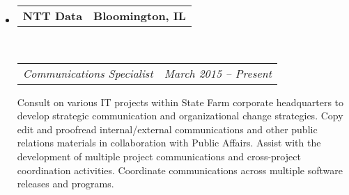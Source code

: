 \documentclass[10pt,letterpaper]{article}
\makeatletter
\newcommand{\headerrow}[2]
{\begin{tabular*}{\linewidth}{l@{\extracolsep{\fill}}r}
	#1 &
	#2 \\
\end{tabular*}}
\makeatother
\begin{document}
\begin{itemize}
	\item
	\headerrow
		{\textbf{NTT Data}}
		{\textbf{Bloomington, IL}}
	\\
	\headerrow
		{\emph{Communications Specialist}}
		{\emph{March 2015 -- Present}}
        Consult on various IT projects within State Farm corporate headquarters to develop strategic communication and
        organizational change strategies. Copy edit and proofread internal/external communications and other public
        relations materials in collaboration with Public Affairs. Assist with the development of multiple project
        communications and cross-project coordination activities. Coordinate communications across multiple software
        releases and programs.


\end{itemize}
\end{document}
